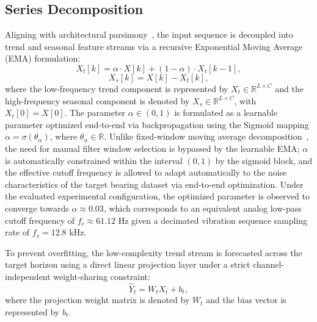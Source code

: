\documentclass[runningheads]{llncs}
\begin{document}
\subsection{Series Decomposition} \label{sect:s3dot2}
Aligning with architectural parsimony~\cite{ref-17}, the input sequence is decoupled into trend and seasonal feature streams via a recursive Exponential Moving Average (EMA) formulation:
\begin{equation}
X_{t}[k] = \alpha \cdot X[k] + (1 - \alpha) \cdot X_{t}[k-1],
\tag{1}
\end{equation}
\begin{equation}
X_{s}[k] = X[k] - X_{t}[k],
\tag{2}
\end{equation}
where the low-frequency trend component is represented by $X_{t} \in \mathbb{R}^{L \times C}$ and the high-frequency seasonal component is denoted by $X_{s} \in \mathbb{R}^{L \times C}$, with $X_{t}[0] = X[0]$. The parameter $\alpha \in (0, 1)$ is formulated as a learnable parameter optimized end-to-end via backpropagation using the Sigmoid mapping $\alpha = \sigma(\theta_\alpha)$, where $\theta_\alpha \in \mathbb{R}$. Unlike fixed-window moving average decomposition~\cite{ref-17}, the need for manual filter window selection is bypassed by the learnable EMA; $\alpha$ is automatically constrained within the interval $(0, 1)$ by the sigmoid block, and the effective cutoff frequency is allowed to adapt automatically to the noise characteristics of the target bearing dataset via end-to-end optimization. Under the evaluated experimental configuration, the optimized parameter is observed to converge towards $\alpha \approx 0.03$, which corresponds to an equivalent analog low-pass cutoff frequency of $f_c \approx 61.12$ Hz given a decimated vibration sequence sampling rate of $f_s = 12.8$ kHz. 

To prevent overfitting, the low-complexity trend stream is forecasted across the target horizon using a direct linear projection layer under a strict channel-independent weight-sharing constraint:
\begin{equation}
\widehat{Y}_{t} = W_{t} X_{t} + b_{t},
\tag{3}
\end{equation}
where the projection weight matrix is denoted by $W_{t}$ and the bias vector is represented by $b_{t}$.
\end{document}
